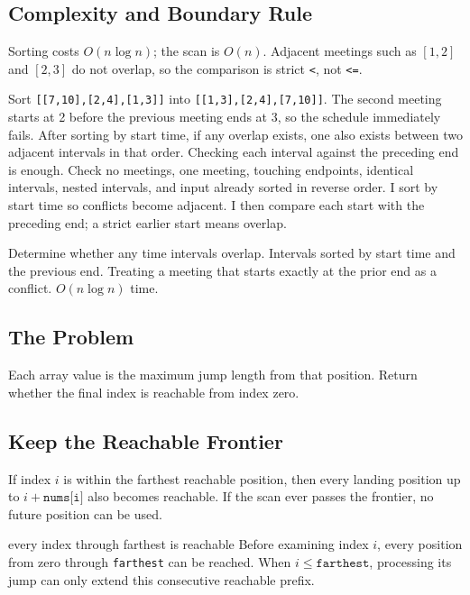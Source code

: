 \subsection{Complexity and Boundary Rule}
Sorting costs \(O(n\log n)\); the scan is \(O(n)\). Adjacent meetings such as
\([1,2]\) and \([2,3]\) do not overlap, so the comparison is strict
\texttt{<}, not \texttt{<=}.

\lessonexpansion
  {Sort \texttt{[[7,10],[2,4],[1,3]]} into
   \texttt{[[1,3],[2,4],[7,10]]}. The second meeting starts at 2 before the
   previous meeting ends at 3, so the schedule immediately fails.}
  {After sorting by start time, if any overlap exists, one also exists between
   two adjacent intervals in that order. Checking each interval against the
   preceding end is enough.}
  {Check no meetings, one meeting, touching endpoints, identical intervals,
   nested intervals, and input already sorted in reverse order.}
  {I sort by start time so conflicts become adjacent. I then compare each
   start with the preceding end; a strict earlier start means overlap.}

\chaptercheckpoint
  {Determine whether any time intervals overlap.}
  {Intervals sorted by start time and the previous end.}
  {Treating a meeting that starts exactly at the prior end as a conflict.}
  {$O(n\log n)$ time.}



\subsection{The Problem}
Each array value is the maximum jump length from that position. Return whether
the final index is reachable from index zero.

\subsection{Keep the Reachable Frontier}
If index \(i\) is within the farthest reachable position, then every landing
position up to \(i+\texttt{nums[i]}\) also becomes reachable. If the scan ever
passes the frontier, no future position can be used.

\begin{invariantbox}{every index through farthest is reachable}
Before examining index \(i\), every position from zero through
\texttt{farthest} can be reached. When \(i\le\texttt{farthest}\), processing
its jump can only extend this consecutive reachable prefix.
\end{invariantbox}

